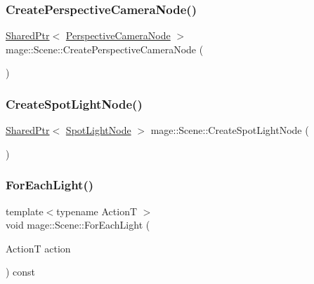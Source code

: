 \hypertarget{classmage_1_1_scene_a3f4141d407133e6419af92376bc3ecc1}{}\label{classmage_1_1_scene_a3f4141d407133e6419af92376bc3ecc1} 
\subsubsection{\texorpdfstring{Create\+Perspective\+Camera\+Node()}{CreatePerspectiveCameraNode()}}
{\footnotesize\ttfamily \hyperlink{namespacemage_a1e01ae66713838a7a67d30e44c67703e}{Shared\+Ptr}$<$ \hyperlink{namespacemage_ad6f2ef4a25873e73e8fa38b06425939f}{Perspective\+Camera\+Node} $>$ mage\+::\+Scene\+::\+Create\+Perspective\+Camera\+Node (\begin{DoxyParamCaption}{ }\end{DoxyParamCaption})}

\hypertarget{classmage_1_1_scene_a27ffb510eeb8e208ba20ee0d76138a3f}{}\label{classmage_1_1_scene_a27ffb510eeb8e208ba20ee0d76138a3f} 
\subsubsection{\texorpdfstring{Create\+Spot\+Light\+Node()}{CreateSpotLightNode()}}
{\footnotesize\ttfamily \hyperlink{namespacemage_a1e01ae66713838a7a67d30e44c67703e}{Shared\+Ptr}$<$ \hyperlink{namespacemage_aeed5dee4ff6c591eabb0e9114256df4a}{Spot\+Light\+Node} $>$ mage\+::\+Scene\+::\+Create\+Spot\+Light\+Node (\begin{DoxyParamCaption}{ }\end{DoxyParamCaption})}

\hypertarget{classmage_1_1_scene_a131c27235c6f172a316c56fea7f2e80c}{}\label{classmage_1_1_scene_a131c27235c6f172a316c56fea7f2e80c} 
\subsubsection{\texorpdfstring{For\+Each\+Light()}{ForEachLight()}}
{\footnotesize\ttfamily template$<$typename ActionT $>$ \\
void mage\+::\+Scene\+::\+For\+Each\+Light (\begin{DoxyParamCaption}\item[{ActionT}]{action }\end{DoxyParamCaption}) const\hspace{0.3cm}{\ttfamily [private]}}

